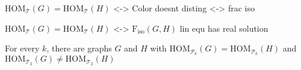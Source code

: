 \begin{theorem}\label{dell-1: thm-1}
    $\text{HOM}_{\mathcal{T}}(G)=\text{HOM}_{\mathcal{T}}(H)$ <-> Color doesnt disting <-> frac iso
\end{theorem}




\begin{theorem}\label{dell-1: thm-2}
    $\text{HOM}_{\mathcal{T}}(G)=\text{HOM}_{\mathcal{T}}(H)$ <-> $\text{F}_{\text{iso}}(G,H)$ lin equ has real solution
\end{theorem}

\begin{theorem}
    For every $k$, there are graphs $G$ and $H$ with $\text{HOM}_{\mathcal{P}_k}(G)=\text{HOM}_{\mathcal{P}_k}(H)$ and 
    $\text{HOM}_{\mathcal{T}_2}(G)\neq\text{HOM}_{\mathcal{T}_2}(H)$
\end{theorem}




